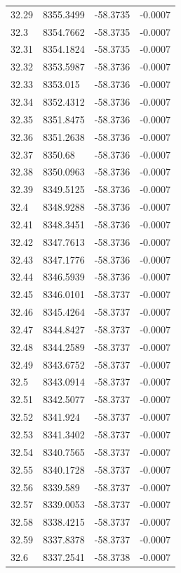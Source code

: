 \begin{table}[H]
\begin{tabular}{llll}
32.29 & 8355.3499 & -58.3735 & -0.0007 \\
32.3 & 8354.7662 & -58.3735 & -0.0007 \\
32.31 & 8354.1824 & -58.3735 & -0.0007 \\
32.32 & 8353.5987 & -58.3736 & -0.0007 \\
32.33 & 8353.015 & -58.3736 & -0.0007 \\
32.34 & 8352.4312 & -58.3736 & -0.0007 \\
32.35 & 8351.8475 & -58.3736 & -0.0007 \\
32.36 & 8351.2638 & -58.3736 & -0.0007 \\
32.37 & 8350.68 & -58.3736 & -0.0007 \\
32.38 & 8350.0963 & -58.3736 & -0.0007 \\
32.39 & 8349.5125 & -58.3736 & -0.0007 \\
32.4 & 8348.9288 & -58.3736 & -0.0007 \\
32.41 & 8348.3451 & -58.3736 & -0.0007 \\
32.42 & 8347.7613 & -58.3736 & -0.0007 \\
32.43 & 8347.1776 & -58.3736 & -0.0007 \\
32.44 & 8346.5939 & -58.3736 & -0.0007 \\
32.45 & 8346.0101 & -58.3737 & -0.0007 \\
32.46 & 8345.4264 & -58.3737 & -0.0007 \\
32.47 & 8344.8427 & -58.3737 & -0.0007 \\
32.48 & 8344.2589 & -58.3737 & -0.0007 \\
32.49 & 8343.6752 & -58.3737 & -0.0007 \\
32.5 & 8343.0914 & -58.3737 & -0.0007 \\
32.51 & 8342.5077 & -58.3737 & -0.0007 \\
32.52 & 8341.924 & -58.3737 & -0.0007 \\
32.53 & 8341.3402 & -58.3737 & -0.0007 \\
32.54 & 8340.7565 & -58.3737 & -0.0007 \\
32.55 & 8340.1728 & -58.3737 & -0.0007 \\
32.56 & 8339.589 & -58.3737 & -0.0007 \\
32.57 & 8339.0053 & -58.3737 & -0.0007 \\
32.58 & 8338.4215 & -58.3737 & -0.0007 \\
32.59 & 8337.8378 & -58.3737 & -0.0007 \\
32.6 & 8337.2541 & -58.3738 & -0.0007 \\

\end{tabular}
\end{table}
